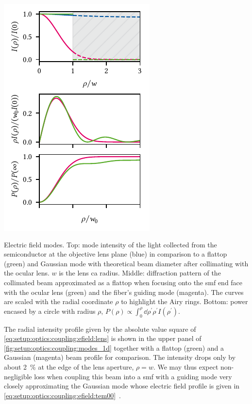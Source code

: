 \begin{marginfigure}
    \centering
    \includegraphics{img/pdf/setup/modes_1d}
    \caption[]{
        Electric field modes.
        Top: mode intensity of the light collected from the semiconductor at the objective lens plane (blue) in comparison to a flattop (green) and Gaussian  mode with theoretical beam diameter after collimating with the ocular lens.
        $w$ is the lens \gls{ca} radius.
        Middle: diffraction pattern of the collimated beam approximated as a flattop when focusing onto the \gls{smf} end face with the ocular lens (green) and the fiber's guiding mode (magenta).
        The curves are scaled with the radial coordinate $\rho$ to highlight the Airy rings.
        Bottom: power encased by a circle with radius $\rho$, $P(\rho)\propto\int_0^{\rho}\dd{\rho^\prime} \rho^{\prime} I(\rho^{\prime})$.
    }
    \label{fig:setup:optics:coupling:modes_1d}
\end{marginfigure}

The radial intensity profile given by the absolute value square of \cref{eq:setup:optics:coupling:efield:lens} is shown in the upper panel of \cref{fig:setup:optics:coupling:modes_1d} together with a flattop (green) and a Gaussian (magenta) beam profile for comparison.
The intensity drops only by about \qty{2}{\percent} at the edge of the lens aperture, $\rho=w$.
We may thus expect non-negligible loss when coupling this beam into a \gls{smf} with a guiding mode very closely approximating the Gaussian  mode whose electric field profile is given in \cref{eq:setup:optics:coupling:efield:tem00}~\cite{Kowalevicz2006}.

